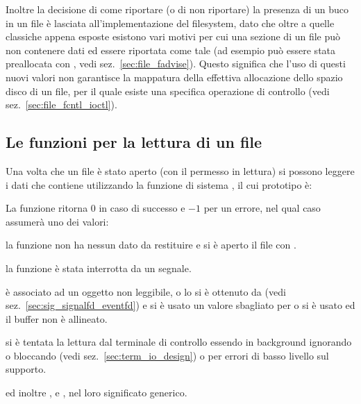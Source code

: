 Inoltre la decisione di come riportare (o di non riportare) la presenza di un
buco in un file è lasciata all'implementazione del filesystem, dato che oltre
a quelle classiche appena esposte esistono vari motivi per cui una sezione di
un file può non contenere dati ed essere riportata come tale (ad esempio può
essere stata preallocata con , vedi
sez.~\ref{sec:file_fadvise}). Questo significa che l'uso di questi nuovi
valori non garantisce la mappatura della effettiva allocazione dello spazio
disco di un file, per il quale esiste una specifica operazione di controllo
(vedi sez.~\ref{sec:file_fcntl_ioctl}).



\subsection{Le funzioni per la lettura di un file}
\label{sec:file_read}

Una volta che un file è stato aperto (con il permesso in lettura) si possono
leggere i dati che contiene utilizzando la funzione di sistema ,
il cui prototipo è:

\begin{funcproto}{
}

{La funzione ritorna $0$ in caso di successo e $-1$ per un errore, nel qual
  caso  assumerà uno dei valori: 
  \begin{errlist}
  \item[\errcode{EAGAIN}] la funzione non ha nessun dato da restituire e si è
    aperto il file con .
  \item[\errcode{EINTR}] la funzione è stata interrotta da un segnale.
  \item[\errcode{EINVAL}]  è associato ad un oggetto non leggibile,
    o lo si è ottenuto da  (vedi
    sez.~\ref{sec:sig_signalfd_eventfd}) e si è usato un valore sbagliato
    per  o si è usato  ed il buffer non è
    allineato.
  \item[\errval{EIO}] si è tentata la lettura dal terminale di controllo
    essendo in background ignorando o bloccando  (vedi
    sez.~\ref{sec:term_io_design}) o per errori di basso livello sul supporto.
  \end{errlist}
  ed inoltre ,  e , nel loro
  significato generico.}
\end{funcproto}

